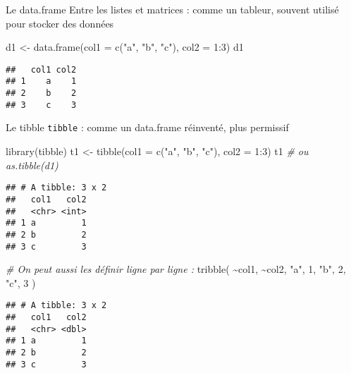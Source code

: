 \documentclass[10pt,xcolor=table,color={dvipsnames,usenames},ignorenonframetext,usepdftitle=false,french]{beamer}
\newenvironment{Shaded}{\begin{snugshade}}{\end{snugshade}}
\newcommand{\AttributeTok}[1]{\textcolor[rgb]{0.77,0.63,0.00}{#1}}
\newcommand{\CommentTok}[1]{\textcolor[rgb]{0.56,0.35,0.01}{\textit{#1}}}
\newcommand{\DecValTok}[1]{\textcolor[rgb]{0.00,0.00,0.81}{#1}}
\newcommand{\FunctionTok}[1]{\textcolor[rgb]{0.00,0.00,0.00}{#1}}
\newcommand{\NormalTok}[1]{#1}
\newcommand{\OtherTok}[1]{\textcolor[rgb]{0.56,0.35,0.01}{#1}}
\newcommand{\SpecialCharTok}[1]{\textcolor[rgb]{0.00,0.00,0.00}{#1}}
\newcommand{\StringTok}[1]{\textcolor[rgb]{0.31,0.60,0.02}{#1}}
\begin{document}
\begin{frame}{Le data.frame}
\protect\hypertarget{le-data.frame}{}
Entre les listes et matrices : comme un tableur, souvent utilisé pour
stocker des données

\begin{Shaded}
\begin{Highlighting}[]
\NormalTok{d1 }\OtherTok{\textless{}{-}} \FunctionTok{data.frame}\NormalTok{(}\AttributeTok{col1 =} \FunctionTok{c}\NormalTok{(}\StringTok{"a"}\NormalTok{, }\StringTok{"b"}\NormalTok{, }\StringTok{"c"}\NormalTok{), }\AttributeTok{col2 =} \DecValTok{1}\SpecialCharTok{:}\DecValTok{3}\NormalTok{)}
\NormalTok{d1}
\end{Highlighting}
\end{Shaded}

\begin{verbatim}
##   col1 col2
## 1    a    1
## 2    b    2
## 3    c    3
\end{verbatim}
\end{frame}

\begin{frame}{Le tibble}
\protect\hypertarget{le-tibble}{}
\texttt{tibble} : comme un data.frame réinventé, plus permissif

\begin{Shaded}
\begin{Highlighting}[]
\FunctionTok{library}\NormalTok{(tibble)}
\NormalTok{t1 }\OtherTok{\textless{}{-}} \FunctionTok{tibble}\NormalTok{(}\AttributeTok{col1 =} \FunctionTok{c}\NormalTok{(}\StringTok{"a"}\NormalTok{, }\StringTok{"b"}\NormalTok{, }\StringTok{"c"}\NormalTok{), }\AttributeTok{col2 =} \DecValTok{1}\SpecialCharTok{:}\DecValTok{3}\NormalTok{)}
\NormalTok{t1 }\CommentTok{\# ou as.tibble(d1)}
\end{Highlighting}
\end{Shaded}

\begin{verbatim}
## # A tibble: 3 x 2
##   col1   col2
##   <chr> <int>
## 1 a         1
## 2 b         2
## 3 c         3
\end{verbatim}

\begin{Shaded}
\begin{Highlighting}[]
\CommentTok{\# On peut aussi les définir ligne par ligne :}
\FunctionTok{tribble}\NormalTok{(}
  \SpecialCharTok{\textasciitilde{}}\NormalTok{col1, }\SpecialCharTok{\textasciitilde{}}\NormalTok{col2,}
  \StringTok{"a"}\NormalTok{, }\DecValTok{1}\NormalTok{,}
  \StringTok{"b"}\NormalTok{, }\DecValTok{2}\NormalTok{,}
  \StringTok{"c"}\NormalTok{, }\DecValTok{3}
\NormalTok{)}
\end{Highlighting}
\end{Shaded}

\begin{verbatim}
## # A tibble: 3 x 2
##   col1   col2
##   <chr> <dbl>
## 1 a         1
## 2 b         2
## 3 c         3
\end{verbatim}
\end{frame}
\end{document}
